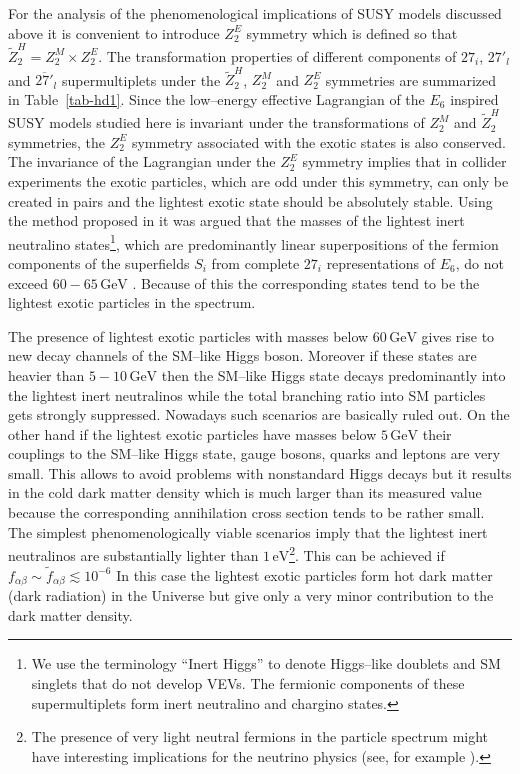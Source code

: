 \documentclass[12pt,a4paper]{article}
\begin{document}
For the analysis of the phenomenological implications of SUSY models discussed
above it is convenient to introduce $Z_{2}^{E}$ symmetry which is defined so that
$\tilde{Z}^{H}_2 = Z_{2}^{M}\times Z_{2}^{E}$. The transformation properties
of different components of $27_i$, $27'_l$ and $\overline{27'}_l$ supermultiplets under
the $\tilde{Z}^{H}_2$, $Z_{2}^{M}$ and $Z_{2}^{E}$ symmetries are summarized
in Table~\ref{tab-hd1}. Since the low--energy effective Lagrangian of the $E_6$ inspired
SUSY models studied here is invariant under the transformations of $Z_{2}^{M}$ and
$\tilde{Z}^{H}_2$ symmetries, the $Z_{2}^{E}$ symmetry associated with the exotic
states is also conserved. The invariance of the Lagrangian under the $Z_{2}^{E}$ symmetry
implies that in collider experiments the exotic particles, which are odd under this symmetry,
can only be created in pairs and the lightest exotic state should be absolutely stable.
Using the method proposed in \cite{Hesselbach:2007te} it was argued that the masses
of the lightest inert neutralino states\footnote{We use the terminology ``Inert Higgs'' to
denote Higgs--like doublets and SM singlets that do not develop VEVs. The fermionic components
of these supermultiplets form inert neutralino and chargino states.}, which are predominantly linear
superpositions of the fermion components of the superfields $S_i$ from complete $27_i$
representations of $E_6$, do not exceed $60-65\,\mbox{GeV}$ \cite{Hall:2010ix}.
Because of this the corresponding states tend to be the lightest exotic particles in the spectrum.

The presence of lightest exotic particles with masses below $60\,\mbox{GeV}$ gives rise to
new decay channels of the SM--like Higgs boson. Moreover if these states are heavier
than $5-10\,\mbox{GeV}$ then the SM--like Higgs state decays predominantly into the
lightest inert neutralinos while the total branching ratio into SM particles gets strongly suppressed.
Nowadays such scenarios are basically ruled out. On the other hand if the lightest exotic particles
have masses below $5\,\mbox{GeV}$ their couplings to the SM--like Higgs state, gauge bosons,
quarks and leptons are very small. This allows to avoid problems with nonstandard Higgs
decays but it results in the cold dark matter density which is much larger than its measured value
because the corresponding annihilation cross section tends to be rather small.
The simplest phenomenologically viable scenarios imply that the lightest inert neutralinos
are substantially lighter than $1\,\mbox{eV}$\footnote{The presence of very light neutral fermions
in the particle spectrum might have interesting implications for the neutrino physics (see, for
example \cite{Frere:1996gb}).}. This can be achieved if $f_{\alpha\beta}\sim \tilde{f}_{\alpha\beta}\lesssim 10^{-6}$
In this case the lightest exotic particles form hot dark matter (dark radiation) in the Universe
but give only a very minor contribution to the dark matter density.
\end{document}

